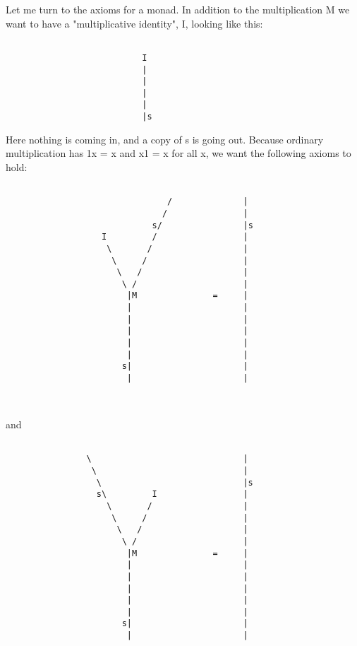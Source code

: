 Let me turn to the axioms for a monad.  In addition to the multiplication
M we want to have a "multiplicative identity", I, looking like this:
           

\begin{verbatim}

                           I
                           |
                           |
                           |
                           |
                           |s

\end{verbatim}
    
Here nothing is coming in, and a copy of s is going out.  Because ordinary 
multiplication has 1x = x and x1 = x for all x, we want the following axioms 
to hold:



\begin{verbatim}

                                /              |
                               /               |
                             s/                |s
                   I         /                 |  
                    \       /                  | 
                     \     /                   |
                      \   /                    | 
                       \ /                     |
                        |M               =     | 
                        |                      |
                        |                      |
                        |                      |
                        |                      |
                        |                      | 
                       s|                      |
                        |                      | 

   
\end{verbatim}
    
and



\begin{verbatim}

                \                              |
                 \                             |
                  \                            |s
                  s\         I                 |  
                    \       /                  | 
                     \     /                   |
                      \   /                    | 
                       \ /                     |
                        |M               =     | 
                        |                      |
                        |                      |
                        |                      |
                        |                      |
                        |                      | 
                       s|                      |
                        |                      | 


\end{verbatim}
    
